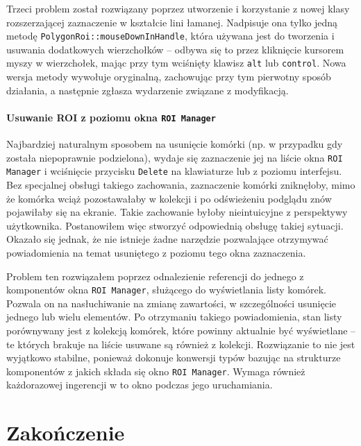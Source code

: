 \documentclass[declaration,shortabstract,mgr]{iithesis}
\begin{document}
Trzeci problem został rozwiązany poprzez utworzenie i korzystanie z nowej klasy rozszerzającej zaznaczenie w kształcie lini łamanej.
Nadpisuje ona tylko jedną metodę \texttt{PolygonRoi::mouseDownInHandle}, która używana jest do tworzenia i usuwania dodatkowych wierzchołków -- odbywa się to przez kliknięcie kursorem myszy w wierzchołek, mając przy tym wciśnięty klawisz \texttt{alt} lub \texttt{control}.
Nowa wersja metody wywołuje oryginalną, zachowując przy tym pierwotny sposób działania, a następnie zgłasza wydarzenie związane z modyfikacją.

\subsubsection{Usuwanie ROI z poziomu okna \texttt{ROI Manager}}

Najbardziej naturalnym sposobem na usunięcie komórki (np. w przypadku gdy została niepoprawnie podzielona), wydaje się zaznaczenie jej na liście okna \texttt{ROI Manager} i wciśnięcie przycisku \texttt{Delete} na klawiaturze lub z poziomu interfejsu.
Bez specjalnej obsługi takiego zachowania, zaznaczenie komórki zniknęłoby, mimo że komórka wciąż pozostawałaby w kolekcji i po odświeżeniu podglądu znów pojawiłaby się na ekranie.
Takie zachowanie byłoby nieintuicyjne z perspektywy użytkownika.
Postanowiłem więc stworzyć odpowiednią obsługę takiej sytuacji.
Okazało się jednak, że nie istnieje żadne narzędzie pozwalające otrzymywać powiadomienia na temat usuniętego z poziomu tego okna zaznaczenia.

Problem ten rozwiązałem poprzez odnalezienie referencji do jednego z komponentów okna \texttt{ROI Manager}, służącego do wyświetlania listy komórek.
Pozwala on na nasłuchiwanie na zmianę zawartości, w szczególności usunięcie jednego lub wielu elementów.
Po otrzymaniu takiego powiadomienia, stan listy porównywany jest z kolekcją komórek, które powinny aktualnie być wyświetlane -- te których brakuje na liście usuwane są również z kolekcji.
Rozwiązanie to nie jest wyjątkowo stabilne, ponieważ dokonuje konwersji typów bazując na strukturze komponentów z jakich składa się okno \texttt{ROI Manager}.
Wymaga również każdorazowej ingerencji w to okno podczas jego uruchamiania.



\chapter{Zakończenie}
\end{document}
